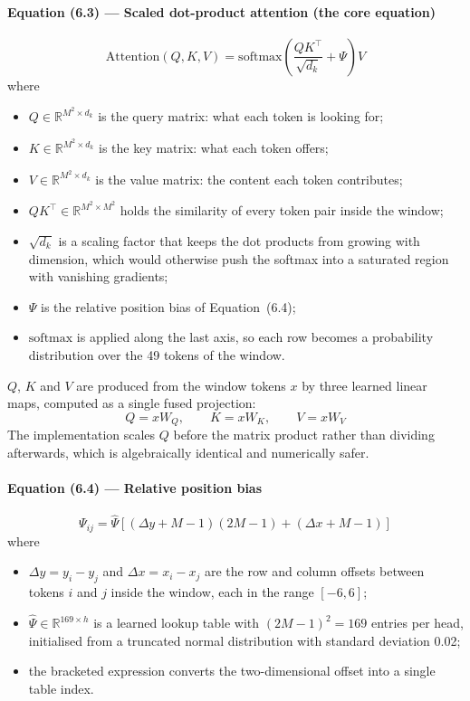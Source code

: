 \documentclass[12pt]{article}
\begin{document}
\paragraph{Equation (6.3) --- Scaled dot-product attention (the core equation)}
\begin{equation}
\mathrm{Attention}(Q,K,V) = \mathrm{softmax}\!\left(\frac{QK^\top}{\sqrt{d_k}} + \Psi\right) V
\end{equation}
where
\begin{itemize}[nosep]
\item $Q \in \mathbb{R}^{M^2 \times d_k}$ is the query matrix: what each token is looking for;
\item $K \in \mathbb{R}^{M^2 \times d_k}$ is the key matrix: what each token offers;
\item $V \in \mathbb{R}^{M^2 \times d_k}$ is the value matrix: the content each token contributes;
\item $QK^\top \in \mathbb{R}^{M^2 \times M^2}$ holds the similarity of every token pair inside the window;
\item $\sqrt{d_k}$ is a scaling factor that keeps the dot products from growing with dimension, which would otherwise push the softmax into a saturated region with vanishing gradients;
\item $\Psi$ is the relative position bias of Equation~(6.4);
\item $\mathrm{softmax}$ is applied along the last axis, so each row becomes a probability distribution over the 49 tokens of the window.
\end{itemize}

$Q$, $K$ and $V$ are produced from the window tokens $x$ by three learned linear maps, computed as a single fused projection:
\begin{equation}
Q = xW_Q, \qquad K = xW_K, \qquad V = xW_V
\end{equation}
The implementation scales $Q$ before the matrix product rather than dividing afterwards, which is algebraically identical and numerically safer.

\paragraph{Equation (6.4) --- Relative position bias}
\begin{equation}
\Psi_{ij} = \widehat{\Psi}\left[(\Delta y + M - 1)(2M-1) + (\Delta x + M - 1)\right]
\end{equation}
where
\begin{itemize}[nosep]
\item $\Delta y = y_i - y_j$ and $\Delta x = x_i - x_j$ are the row and column offsets between tokens $i$ and $j$ inside the window, each in the range $[-6, 6]$;
\item $\widehat{\Psi} \in \mathbb{R}^{169 \times h}$ is a learned lookup table with $(2M-1)^2 = 169$ entries per head, initialised from a truncated normal distribution with standard deviation 0.02;
\item the bracketed expression converts the two-dimensional offset into a single table index.
\end{itemize}
\end{document}
